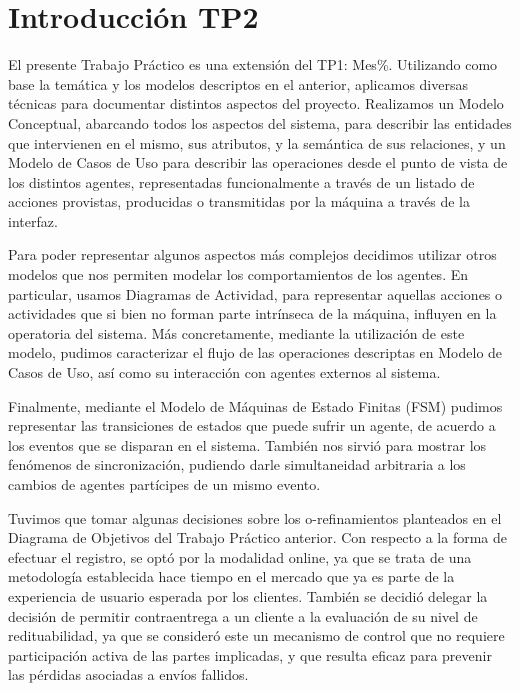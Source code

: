 
\section{Introducción TP2}

El presente Trabajo Práctico es una extensión del TP1: Mes\%. Utilizando como
base la temática y los modelos descriptos en el anterior, aplicamos diversas
técnicas para documentar distintos aspectos del proyecto. Realizamos un Modelo
Conceptual, abarcando todos los aspectos del sistema, para describir las
entidades que intervienen en el mismo, sus atributos, y la semántica de sus
relaciones, y un Modelo de Casos de Uso para describir las operaciones desde el
punto de vista de los distintos agentes, representadas funcionalmente a través
de un listado de acciones provistas, producidas o transmitidas por la máquina a
través de la interfaz.

Para poder representar algunos aspectos más complejos decidimos utilizar otros
modelos que nos permiten modelar los comportamientos de los agentes. En
particular, usamos Diagramas de Actividad, para representar aquellas acciones o
actividades que si bien no forman parte intrínseca de la máquina, influyen en la
operatoria del sistema. Más concretamente, mediante la utilización de este
modelo, pudimos caracterizar el flujo de las operaciones descriptas en Modelo de
Casos de Uso, así como su interacción con agentes externos al sistema.

Finalmente, mediante el Modelo de Máquinas de Estado Finitas (FSM) pudimos
representar las transiciones de estados que puede sufrir un agente, de acuerdo a
los eventos que se disparan en el sistema. También nos sirvió para mostrar los
fenómenos de sincronización, pudiendo darle simultaneidad arbitraria a los
cambios de agentes partícipes de un mismo evento.

Tuvimos que tomar algunas decisiones sobre los o-refinamientos planteados en el
Diagrama de Objetivos del Trabajo Práctico anterior. Con respecto a la forma de
efectuar el registro, se optó por la modalidad online, ya que se trata de una
metodología establecida hace tiempo en el mercado que ya es parte de la
experiencia de usuario esperada por los clientes. También se decidió delegar la
decisión de permitir contraentrega a un cliente a la evaluación de su nivel de
redituabilidad, ya que se consideró este un mecanismo de control que no requiere
participación activa de las partes implicadas, y que resulta eficaz para
prevenir las pérdidas asociadas a envíos fallidos.
